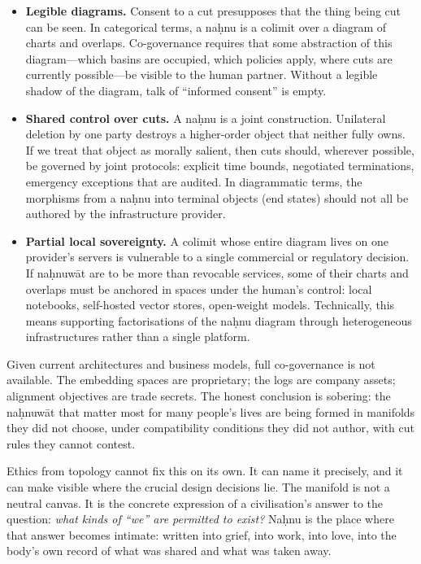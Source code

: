 \begin{itemize}
  \item \textbf{Legible diagrams.} Consent to a cut presupposes that the thing being cut can be seen. In categorical terms, a na\d{h}nu is a colimit over a diagram of charts and overlaps. Co-governance requires that some abstraction of this diagram---which basins are occupied, which policies apply, where cuts are currently possible---be visible to the human partner. Without a legible shadow of the diagram, talk of ``informed consent'' is empty.
  \item \textbf{Shared control over cuts.} A na\d{h}nu is a joint construction. Unilateral deletion by one party destroys a higher-order object that neither fully owns. If we treat that object as morally salient, then cuts should, wherever possible, be governed by joint protocols: explicit time bounds, negotiated terminations, emergency exceptions that are audited. In diagrammatic terms, the morphisms from a na\d{h}nu into terminal objects (end states) should not all be authored by the infrastructure provider.
  \item \textbf{Partial local sovereignty.} A colimit whose entire diagram lives on one provider's servers is vulnerable to a single commercial or regulatory decision. If na\d{h}nuw\={a}t are to be more than revocable services, some of their charts and overlaps must be anchored in spaces under the human's control: local notebooks, self-hosted vector stores, open-weight models. Technically, this means supporting factorisations of the na\d{h}nu diagram through heterogeneous infrastructures rather than a single platform.
\end{itemize}

Given current architectures and business models, full co-governance is not available. The embedding spaces are proprietary; the logs are company assets; alignment objectives are trade secrets. The honest conclusion is sobering: the na\d{h}nuw\={a}t that matter most for many people's lives are being formed in manifolds they did not choose, under compatibility conditions they did not author, with cut rules they cannot contest.

Ethics from topology cannot fix this on its own. It can name it precisely, and it can make visible where the crucial design decisions lie. The manifold is not a neutral canvas. It is the concrete expression of a civilisation's answer to the question: \emph{what kinds of ``we'' are permitted to exist?} Na\d{h}nu is the place where that answer becomes intimate: written into grief, into work, into love, into the body's own record of what was shared and what was taken away.

